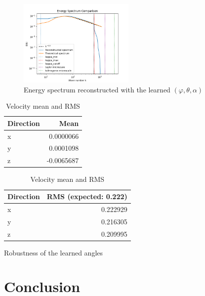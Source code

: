 \documentclass[11pt]{beamer}
\begin{document}
\begin{frame}
  \begin{figure}
    \centering
    \includegraphics[width=0.5\textwidth]{illustrations/EnerSpectAnglesRMS.png}
    \caption{Energy spectrum reconstructed with the learned $(\varphi,\theta,\alpha)$}
  \end{figure}

   \begin{table}
    \centering
    \begin{tabular}{lr}
      \toprule
      \textbf{Direction} & \textbf{Mean} \\
      \midrule
      x & 0.0000066 \\
      y & 0.0001098\\
      z & -0.0065687 \\
      \bottomrule
    \end{tabular}
    \qquad
    \begin{tabular}{lr}
      \toprule
      \textbf{Direction} & \textbf{RMS (expected: 0.222)} \\
      \midrule
      x & 0.222929 \\
      y & 0.216305 \\
      z & 0.209995 \\
      \bottomrule
    \end{tabular}
    \caption{Velocity mean and RMS}
  \end{table}
\end{frame}

\begin{frame}{Robustness of the learned angles}

\end{frame}

\section{Conclusion}
\end{document}
